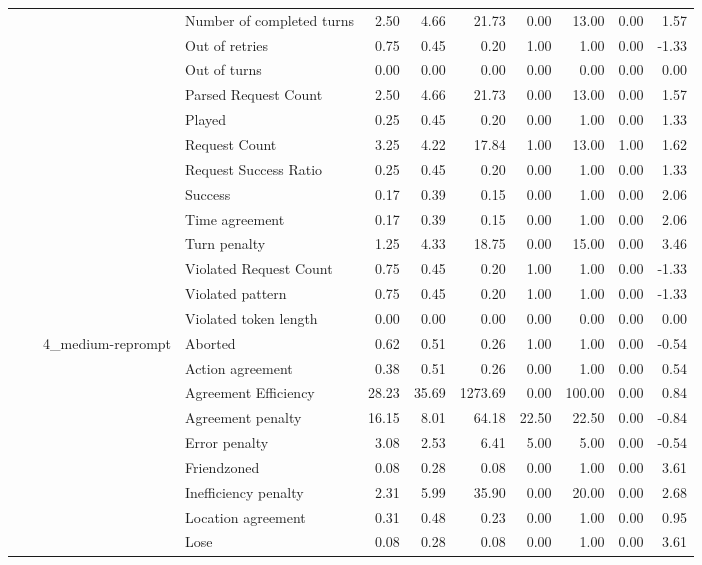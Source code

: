 \begin{tabular}{llllrrrrrrr}
 &  &  & Number of completed turns & 2.50 & 4.66 & 21.73 & 0.00 & 13.00 & 0.00 & 1.57 \\
 &  &  & Out of retries & 0.75 & 0.45 & 0.20 & 1.00 & 1.00 & 0.00 & -1.33 \\
 &  &  & Out of turns & 0.00 & 0.00 & 0.00 & 0.00 & 0.00 & 0.00 & 0.00 \\
 &  &  & Parsed Request Count & 2.50 & 4.66 & 21.73 & 0.00 & 13.00 & 0.00 & 1.57 \\
 &  &  & Played & 0.25 & 0.45 & 0.20 & 0.00 & 1.00 & 0.00 & 1.33 \\
 &  &  & Request Count & 3.25 & 4.22 & 17.84 & 1.00 & 13.00 & 1.00 & 1.62 \\
 &  &  & Request Success Ratio & 0.25 & 0.45 & 0.20 & 0.00 & 1.00 & 0.00 & 1.33 \\
 &  &  & Success & 0.17 & 0.39 & 0.15 & 0.00 & 1.00 & 0.00 & 2.06 \\
 &  &  & Time agreement & 0.17 & 0.39 & 0.15 & 0.00 & 1.00 & 0.00 & 2.06 \\
 &  &  & Turn penalty & 1.25 & 4.33 & 18.75 & 0.00 & 15.00 & 0.00 & 3.46 \\
 &  &  & Violated Request Count & 0.75 & 0.45 & 0.20 & 1.00 & 1.00 & 0.00 & -1.33 \\
 &  &  & Violated pattern & 0.75 & 0.45 & 0.20 & 1.00 & 1.00 & 0.00 & -1.33 \\
 &  &  & Violated token length & 0.00 & 0.00 & 0.00 & 0.00 & 0.00 & 0.00 & 0.00 \\
\cline{3-11}
 &  & \multirow[t]{27}{*}{4_medium-reprompt} & Aborted & 0.62 & 0.51 & 0.26 & 1.00 & 1.00 & 0.00 & -0.54 \\
 &  &  & Action agreement & 0.38 & 0.51 & 0.26 & 0.00 & 1.00 & 0.00 & 0.54 \\
 &  &  & Agreement Efficiency & 28.23 & 35.69 & 1273.69 & 0.00 & 100.00 & 0.00 & 0.84 \\
 &  &  & Agreement penalty & 16.15 & 8.01 & 64.18 & 22.50 & 22.50 & 0.00 & -0.84 \\
 &  &  & Error penalty & 3.08 & 2.53 & 6.41 & 5.00 & 5.00 & 0.00 & -0.54 \\
 &  &  & Friendzoned & 0.08 & 0.28 & 0.08 & 0.00 & 1.00 & 0.00 & 3.61 \\
 &  &  & Inefficiency penalty & 2.31 & 5.99 & 35.90 & 0.00 & 20.00 & 0.00 & 2.68 \\
 &  &  & Location agreement & 0.31 & 0.48 & 0.23 & 0.00 & 1.00 & 0.00 & 0.95 \\
 &  &  & Lose & 0.08 & 0.28 & 0.08 & 0.00 & 1.00 & 0.00 & 3.61 \\

\end{tabular}
